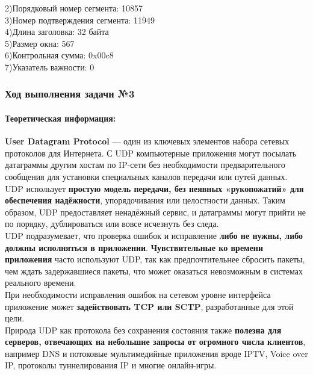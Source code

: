 2)Порядковый номер сегмента: 10857\\


3)Номер подтверждения сегмента: 11949\\


4)Длина заголовка: 32 байта\\


5)Размер окна: 567\\


6)Контрольная сумма: 0x00c8\\


7)Указатель важности: 0\\

\subsubsection{Ход выполнения задачи №3}

\paragraph{Теоретическая информация:\cite{UDP}\\}
\textbf{User Datagram Protocol} — один из ключевых элементов набора сетевых протоколов для Интернета. С UDP компьютерные приложения могут посылать датаграммы другим хостам по IP-сети без необходимости предварительного сообщения для установки специальных каналов передачи или путей данных.\\


UDP использует \textbf{простую модель передачи, без неявных «рукопожатий» для обеспечения надёжности}, упорядочивания или целостности данных. Таким образом, UDP предоставляет ненадёжный сервис, и датаграммы могут прийти не по порядку, дублироваться или вовсе исчезнуть без следа.\\


UDP подразумевает, что проверка ошибок и исправление \textbf{либо не нужны, либо должны исполняться в приложении}. \textbf{Чувствительные ко времени приложения} часто используют UDP, так как предпочтительнее сбросить пакеты, чем ждать задержавшиеся пакеты, что может оказаться невозможным в системах реального времени.\\


При необходимости исправления ошибок на сетевом уровне интерфейса приложение может \textbf{задействовать TCP или SCTP}, разработанные для этой цели.\\


Природа UDP как протокола без сохранения состояния также \textbf{полезна для серверов, отвечающих на небольшие запросы от огромного числа клиентов}, например DNS и потоковые мультимедийные приложения вроде IPTV, Voice over IP, протоколы туннелирования IP и многие онлайн-игры.

